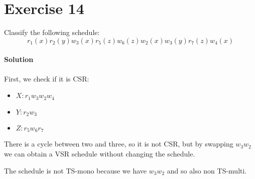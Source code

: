 \section{Exercise 14}

Classify the following schedule:
\[r_1(x) r_2(y) w_3(x) r_5(z) w_6(z) w_2(x) w_3(y) r_7(z) w_4(x)\] 

\paragraph*{Solution}
First, we check if it is CSR:
\begin{itemize}
    \item $X: r_1 w_3 w_2 w_4$
    \item $Y: r_2 w_3$
    \item $Z: r_5 w_6 r_7$
\end{itemize}
There is a cycle between two and three, so it is not CSR, but by swapping $w_3 w_2$ we can obtain a VSR schedule without changing the schedule. 

The schedule is not TS-mono because we have $w_3 w_2$ and so also non TS-multi. 